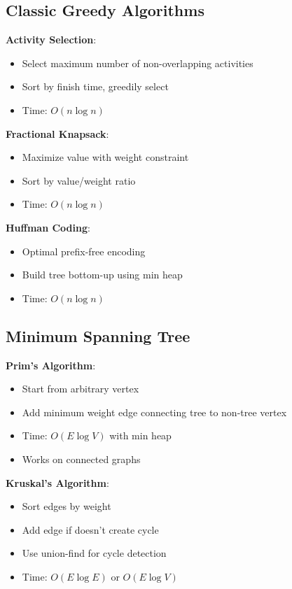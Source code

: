 \documentclass[12pt,a4paper]{report}
\begin{document}
\subsection{Classic Greedy Algorithms}
\begin{concept}
\textbf{Activity Selection}:
\begin{itemize}
    \item Select maximum number of non-overlapping activities
    \item Sort by finish time, greedily select
    \item Time: $O(n \log n)$
\end{itemize}

\textbf{Fractional Knapsack}:
\begin{itemize}
    \item Maximize value with weight constraint
    \item Sort by value/weight ratio
    \item Time: $O(n \log n)$
\end{itemize}

\textbf{Huffman Coding}:
\begin{itemize}
    \item Optimal prefix-free encoding
    \item Build tree bottom-up using min heap
    \item Time: $O(n \log n)$
\end{itemize}
\end{concept}

\subsection{Minimum Spanning Tree}
\begin{concept}
\textbf{Prim's Algorithm}:
\begin{itemize}
    \item Start from arbitrary vertex
    \item Add minimum weight edge connecting tree to non-tree vertex
    \item Time: $O(E \log V)$ with min heap
    \item Works on connected graphs
\end{itemize}

\textbf{Kruskal's Algorithm}:
\begin{itemize}
    \item Sort edges by weight
    \item Add edge if doesn't create cycle
    \item Use union-find for cycle detection
    \item Time: $O(E \log E)$ or $O(E \log V)$
\end{itemize}
\end{concept}
\end{document}
